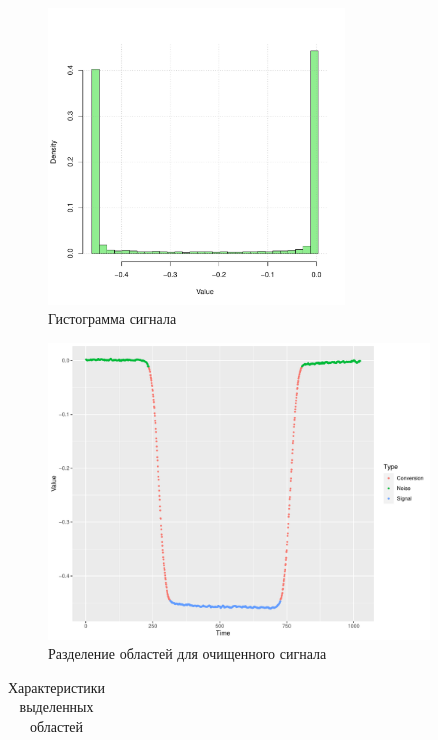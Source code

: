 \documentclass[a4paper]{article}
\begin{document}
\begin{figure}[H]
    \centering
    \includegraphics[width =0.7\textwidth]{LabSrcs/resources/wave_hist.pdf}
    \caption{Гистограмма сигнала}
    \label{fig:histsig}
\end{figure}
\begin{figure}[H]
    \centering
    \includegraphics[width =0.9\textwidth]{LabSrcs/resources/wave_colored_pic.pdf}
    \caption{Разделение областей для очищенного сигнала}
    \label{fig:colwave}
\end{figure}
\begin{table}[H]
    \centering
    \begin{tabular}{|c|c|c|c|}
    \hline
         
    \end{tabular}
    \caption{Характеристики выделенных областей}
    \label{tab:ftesttab}
\end{table}
\end{document}
